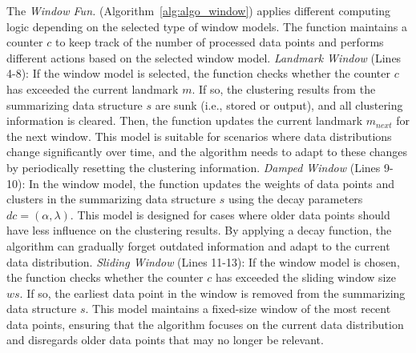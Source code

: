 The \emph{Window Fun.} (Algorithm~\ref{alg:algo_window}) applies different computing logic depending on the selected type of window models. The function maintains a counter $c$ to keep track of the number of processed data points and performs different actions based on the selected window model. 
\emph{Landmark Window} (Lines 4-8): If the \landmark window model is selected, the function checks whether the counter $c$ has exceeded the current landmark $m$. If so, the clustering results from the summarizing data structure $s$ are sunk (i.e., stored or output), and all clustering information is cleared. Then, the function updates the current landmark $m_{next}$ for the next window. This model is suitable for scenarios where data distributions change significantly over time, and the algorithm needs to adapt to these changes by periodically resetting the clustering information.
\emph{Damped Window} (Lines 9-10): In the \damped window model, the function updates the weights of data points and clusters in the summarizing data structure $s$ using the decay parameters $dc = (\alpha, \lambda)$. This model is designed for cases where older data points should have less influence on the clustering results. By applying a decay function, the algorithm can gradually forget outdated information and adapt to the current data distribution.
\emph{Sliding Window} (Lines 11-13): If the \sliding window model is chosen, the function checks whether the counter $c$ has exceeded the sliding window size $ws$. If so, the earliest data point in the window is removed from the summarizing data structure $s$. This model maintains a fixed-size window of the most recent data points, ensuring that the algorithm focuses on the current data distribution and disregards older data points that may no longer be relevant.

\begin{algorithm}[h]
\scriptsize
\caption{Window Fun. of \algo.}
\label{alg:algo_window}
\end{algorithm}

